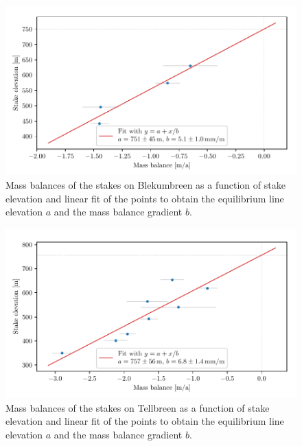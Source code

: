 \begin{table}[h]
	\caption{Mass balance as result of the elevation fits from Fig.~\ref{GPS:fig:elev_tel} and
	mean values of the elevation measurements for all stakes on Tellbreen.
    The data in the table is plotted in Fig.~\ref{GPS:fig:elev_tel_mbg}.}
	\centering
	
	\label{GPS:tab:mbal_tel}
\end{table}

\begin{figure}[H]
    \centering
    \includegraphics[width=\textwidth]{./figs/Elevation_Blekumbreen_mbg.pdf}
    \caption{Mass balances of the stakes on Blekumbreen as a function of stake elevation and linear fit of the points to obtain
    the equilibrium line elevation $a$ and the mass balance gradient $b$.}
    \label{GPS:fig:elev_ble_mbg}
\end{figure}


\begin{figure}[H]
    \centering
    \includegraphics[width=\textwidth]{./figs/Elevation_Tellbreen_mbg.pdf}
    \caption{Mass balances of the stakes on Tellbreen as a function of stake elevation and linear fit of the points to obtain
    the equilibrium line elevation $a$ and the mass balance gradient $b$.}
    \label{GPS:fig:elev_tel_mbg}
\end{figure}

